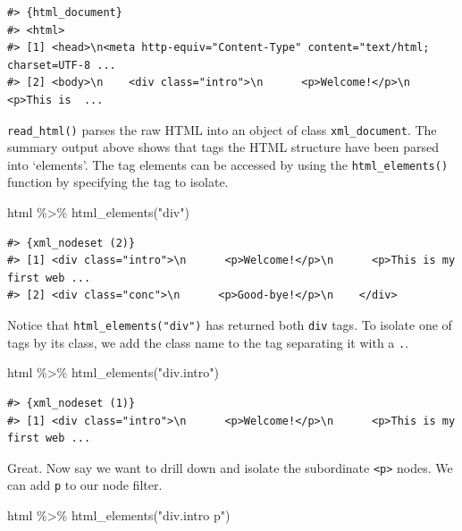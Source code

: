 \documentclass[
  letterpaper,
]{latex/krantz}
\newenvironment{Shaded}{\begin{snugshade}}{\end{snugshade}}
\newcommand{\FunctionTok}[1]{\textcolor[rgb]{0.28,0.35,0.67}{#1}}
\newcommand{\NormalTok}[1]{\textcolor[rgb]{0.00,0.23,0.31}{#1}}
\newcommand{\SpecialCharTok}[1]{\textcolor[rgb]{0.37,0.37,0.37}{#1}}
\newcommand{\StringTok}[1]{\textcolor[rgb]{0.13,0.47,0.30}{#1}}
\begin{document}
\begin{verbatim}
#> {html_document}
#> <html>
#> [1] <head>\n<meta http-equiv="Content-Type" content="text/html; charset=UTF-8 ...
#> [2] <body>\n    <div class="intro">\n      <p>Welcome!</p>\n      <p>This is  ...
\end{verbatim}

\texttt{read\_html()} parses the raw HTML into an object of class
\texttt{xml\_document}. The summary output above shows that tags the
HTML structure have been parsed into `elements'. The tag elements can be
accessed by using the \texttt{html\_elements()} function by specifying
the tag to isolate.

\begin{Shaded}
\begin{Highlighting}[]
\NormalTok{html }\SpecialCharTok{\%\textgreater{}\%} 
  \FunctionTok{html\_elements}\NormalTok{(}\StringTok{"div"}\NormalTok{)}
\end{Highlighting}
\end{Shaded}

\begin{verbatim}
#> {xml_nodeset (2)}
#> [1] <div class="intro">\n      <p>Welcome!</p>\n      <p>This is my first web ...
#> [2] <div class="conc">\n      <p>Good-bye!</p>\n    </div>
\end{verbatim}

Notice that \texttt{html\_elements("div")} has returned both
\texttt{div} tags. To isolate one of tags by its class, we add the class
name to the tag separating it with a \texttt{.}.

\begin{Shaded}
\begin{Highlighting}[]
\NormalTok{html }\SpecialCharTok{\%\textgreater{}\%} 
  \FunctionTok{html\_elements}\NormalTok{(}\StringTok{"div.intro"}\NormalTok{)}
\end{Highlighting}
\end{Shaded}

\begin{verbatim}
#> {xml_nodeset (1)}
#> [1] <div class="intro">\n      <p>Welcome!</p>\n      <p>This is my first web ...
\end{verbatim}

Great. Now say we want to drill down and isolate the subordinate
\texttt{\textless{}p\textgreater{}} nodes. We can add \texttt{p} to our
node filter.

\begin{Shaded}
\begin{Highlighting}[]
\NormalTok{html }\SpecialCharTok{\%\textgreater{}\%} 
  \FunctionTok{html\_elements}\NormalTok{(}\StringTok{"div.intro p"}\NormalTok{)}
\end{Highlighting}
\end{Shaded}
\end{document}
